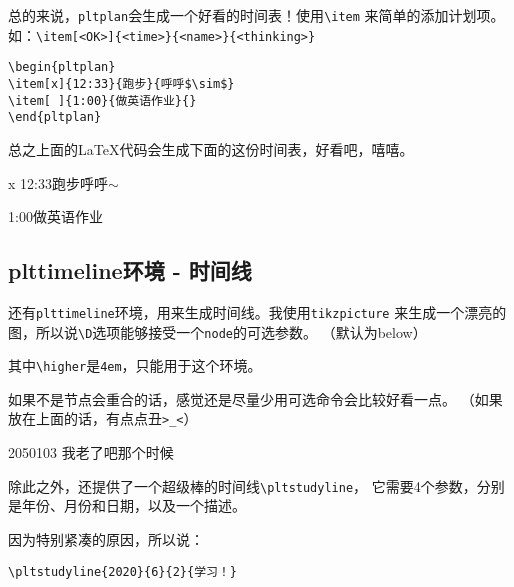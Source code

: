 \documentclass{../src/peterlitsdoc}
\newcommand{\vb}{\verb}
\begin{document}
总的来说，\vb|pltplan|会生成一个好看的时间表！使用\vb|\item|
来简单的添加计划项。如：\vb|\item[<OK>]{<time>}{<name>}{<thinking>}|

\begin{lstlisting}
\begin{pltplan}
\item[x]{12:33}{跑步}{呼呼$\sim$}
\item[ ]{1:00}{做英语作业}{}
\end{pltplan}
\end{lstlisting}

总之上面的\LaTeX{}代码会生成下面的这份时间表，好看吧，嘻嘻。

\begin{pltplan}
\item[x]{12:33}{跑步}{呼呼$\sim$}
\item[ ]{1:00}{做英语作业}{}
\end{pltplan}


\subsection{plttimeline环境 - 时间线}

还有\vb|plttimeline|环境，用来生成时间线。我使用\vb|tikzpicture|%
来生成一个漂亮的图，所以说\vb|\D|选项能够接受一个\vb|node|的可选参数。
（默认为below）

其中\vb|\higher|是\vb|4em|，只能用于这个环境。

如果不是节点会重合的话，感觉还是尽量少用可选命令会比较好看一点。
（如果放在上面的话，有点点丑\vb|>_<|）

\begin{pltrun}
\begin{plttimeline}{2050}{10}{3}
    {我老了吧那个时候}
\end{plttimeline}
\end{pltrun}

除此之外，还提供了一个超级棒的时间线\vb|\pltstudyline|，
它需要4个参数，分别是年份、月份和日期，以及一个描述。

因为特别紧凑的原因，所以说：

\begin{lstlisting}
\pltstudyline{2020}{6}{2}{学习！}
\end{lstlisting}
\end{document}
